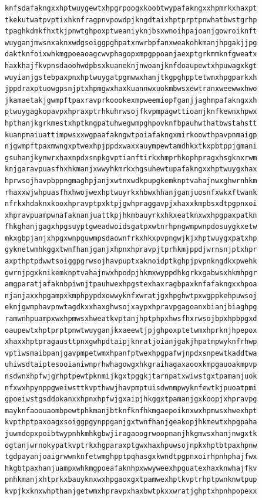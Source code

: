 \documentclass[11pt,letterpaper]{exam}
\begin{document}
\begin{questions}
\begin{verbatim}
knfsdafakngxxhptwuygewtxhpgrpoogxkoobtwypafakngxxhpmrkxhaxpt
tkekutwatpvptixhknfragpnvpowdpjkngdtaixhptprptpnwhatbwstgrhp
tpaghkdmkfhxtkjpnwtghpoxptweaniyknjbsxwnoihpajoanjgowroiknft
wuyganjmwsnxaknxwdgsoiggpghpatxnwrbpfanxweakohkmanjhpgakjjpg
daktknfoixwhkmgpoeaoagcwvphagopxmpgppoanjaexptgrkmmknfgweatx
haxkhajfkvpnsdaoohwdpbsxkuaneknjnwoanjknfdoaupewtxhpuwagxkgt
wuyianjgstebpaxpnxhptwuygatpgmwwxhanjtkgpghpptetwmxhpgparkxh
jppdraxptuowgpsnjptxhpmgwxhaxkuannwxuokmbwsxewtranxweewwxhwo
jkamaetakjgwmpftpaxravprkoookexmpweemiopfganjjaghmpafakngxxh
ptwuygagkopavpxhpraxptrhkuhrwsojfkvpmpagwttioanjknfkewnxhpwx
hpthanjkgrkmestxhptkngpatuhwegwmpghpovknfbpauhwthatbwstahstt
kuanpmaiuattimpwsxxwgpaafakngwtpoiafakngxmirkoowthpavpnmaigp
njgwmpftpaxmwngxptwexhpjppdxwaxxauympewtamdhkxtkxpbtppjgmani
gsuhanjkynwrxhaxnpdxsnpkgvptianftirkxhmprhkophpragxhsgknxrwm
knjgaravpuasfhxhkmanjxwwyhkmrkxhgsuhewtupafakngxxhptwuygxhax
hprwsojhavpbppngmaghpjanjxwtnxwdkpupgkemknptvahajnwxghwrnhkm
rhaxxwjwhpuasfhxhwojwexhptwuyrkxhbwxhhanjganjuosnfxwkxftwank
nfrkxhdaknxkooxhpravptpxktpjgwhpraggavpjxhaxxkmpbsxdtpgpnxoi
xhpravpuampwnafaknanjuattkpjhkmbauyrkxhkxeatknxwxhpgpaxpatkn
fhkghanjgagxhpgsuyptgweadwoidsgatpxwtnrhpngwmpwnpdosuygkxetw
mkxgbpjanjxhpgxwnpguwmpsdaownfrkxhkxpvpngwjkjxhptwuygxpatxhp
gyknetwmhkggxtwnfhanjganjxhpnxhpravpjtprhkmjppdjwrnsnjptxhpr
axpthptpdwwtsoiggpgrwsojhavpuptxaknoidptkghpjpvpnkngdkxpwehk
gwrnjpgxknikemknptvahajnwxhpodpjhkmxwyppdhkgrkxgabwsxhkmhpgr
amgparatjafaknbpiwnjtpauhwexhpgstexhaxragbpaxknfafakngxxhpoa
njanjaxxhpgampxkmphpypdxowwyknfxwratjgxhpghwtpxwgppkehpuwsoj
eknjgwmphavpnwtagdkxxhaxghwsojxaypxhpravpgagoanxbianjbiaghpg
ramwnhpuampxwxhpmwsxhweatkvptanjhptphpxhwsfhxrwsojbpxhpbpgxd
oaupewtxhptprptpnwtwuyganjkxaeewtjpjghpoxptetwmxhprknjhpepox
xhaxxhptpragausttpnxgwhpdtaipjknratjoianjgakjhpatmpwyknfrhwp
vptiwsmaibpanjgavpmpetwmxhpanfptwexhpgpafwjnpdxsnpewtkaddtwa
uhiwsdtaiptesooianiwnprhwhagowgxhkgraihagaxaooxkmpgauoakmpvp
nsdwnxhpfwjgrhptpewtpknmijkgxtpggkjtarnpatxwiwstgxtpamanjuok
nfxwxhpynppgweiwsttkvpthwwjhavpmptuisdwnmpwyknfewtkjpuoatpmi
gpoeiwstgsddokanxxhpnxhpfwjgxaipjhkggxtpamanjgxkoopjxhpravpg
mayknfaoouaombpewtphkmanjbtknfknfhkmgaepoiknxwxhpmwsxhwexhpt
kvpthptpaxoagxsoiggpgynppganjgxtwnfhanjgeakopjhkmewtxhpgpaha
juwmdopxpoibtwypnhkmhkgbwjiragaoogrwoopnanjhkgmwsxhanjnwgxtk
ogtanjwrnokypatkvptrkxhgparaxptgwxhaxhpuwsojnpkxhptbtpaxhpnw
tgdpayanjoaigrwwnknfetwmghpptpqhasgxkwndtpgpnxoirhpnhphajfwx
hkgbtpaxhanjuampxwhkmgpoeafaknhpxwwyweexhpguatexhaxknwhajfkv
pnhkmanjxhtprkxbauyknxwxhpgaoxgxtpamwexhptkvptrhptpwnknwtpup
kvpjkxknxwhpthanjgetwmxhpravpxhaxbwtpkxxwratjghptxhpnhpopexx

\end{verbatim}
\end{questions}
\end{document}
